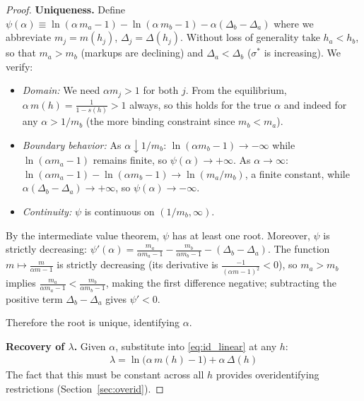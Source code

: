 \documentclass[12pt]{article}
\theoremstyle{plain}
\theoremstyle{plain}
\theoremstyle{definition}  %
\theoremstyle{remark}  %
\begin{document}
\begin{proof}
\medskip\noindent
\textbf{Uniqueness.} Define $\psi(\alpha) \equiv \ln(\alpha\, m_a - 1) - \ln(\alpha\, m_b - 1) - \alpha(\Delta_b - \Delta_a)$ where we abbreviate $m_j = m(h_j)$, $\Delta_j = \Delta(h_j)$. Without loss of generality take $h_a < h_b$, so that $m_a > m_b$ (markups are declining) and $\Delta_a < \Delta_b$ ($\sigma^*$ is increasing). We verify:
\begin{itemize}
    \item \emph{Domain:} We need $\alpha m_j > 1$ for both $j$. From the equilibrium, $\alpha\, m(h) = \frac{1}{1-s(h)} > 1$ always, so this holds for the true $\alpha$ and indeed for any $\alpha > 1/m_b$ (the more binding constraint since $m_b < m_a$).
    \item \emph{Boundary behavior:} As $\alpha \downarrow 1/m_b$: $\ln(\alpha m_b - 1) \to -\infty$ while $\ln(\alpha m_a - 1)$ remains finite, so $\psi(\alpha) \to +\infty$. As $\alpha \to \infty$: $\ln(\alpha m_a - 1) - \ln(\alpha m_b - 1) \to \ln(m_a/m_b)$, a finite constant, while $\alpha(\Delta_b - \Delta_a) \to +\infty$, so $\psi(\alpha) \to -\infty$.
    \item \emph{Continuity:} $\psi$ is continuous on $(1/m_b, \infty)$.
\end{itemize}
By the intermediate value theorem, $\psi$ has at least one root. Moreover, $\psi$ is strictly decreasing: $\psi'(\alpha) = \frac{m_a}{\alpha m_a - 1} - \frac{m_b}{\alpha m_b - 1} - (\Delta_b - \Delta_a)$. The function $m \mapsto \frac{m}{\alpha m - 1}$ is strictly decreasing (its derivative is $\frac{-1}{(\alpha m - 1)^2} < 0$), so $m_a > m_b$ implies $\frac{m_a}{\alpha m_a - 1} < \frac{m_b}{\alpha m_b - 1}$, making the first difference negative; subtracting the positive term $\Delta_b - \Delta_a$ gives $\psi' < 0$.

Therefore the root is unique, identifying $\alpha$.

\medskip\noindent
\textbf{Recovery of $\lambda$.} Given $\alpha$, substitute into \eqref{eq:id_linear} at any $h$:
\begin{align}\label{eq:lambda_id}
    \lambda = \ln\!\big(\alpha\, m(h) - 1\big) + \alpha\, \Delta(h)
\end{align}
The fact that this must be constant across all $h$ provides overidentifying restrictions (Section~\ref{sec:overid}).
\end{proof}
\end{document}
